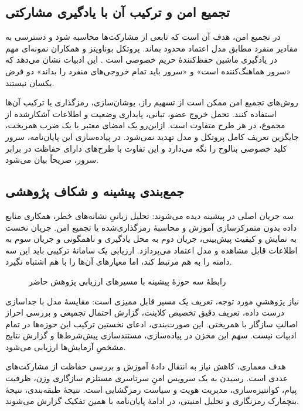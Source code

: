 \subsection{تجمیع امن و ترکیب آن با یادگیری مشارکتی}
در تجمیع امن، هدف آن است که تابعی از مشارکت‌ها محاسبه شود و دسترسی به مقادیر منفرد مطابق مدل اعتماد محدود بماند. پروتکل بوناویتز و همکاران نمونه‌ای مهم در یادگیری ماشین حفظ‌کنندۀ حریم خصوصی است \cite{bonawitz}. این ادبیات نشان می‌دهد که «سرور هماهنگ‌کننده است» و «سرور باید تمام خروجی‌های منفرد را بداند» دو فرض یکسان نیستند.

روش‌های تجمیع امن ممکن است از تسهیم راز، پوشان‌سازی، رمزگذاری یا ترکیب آن‌ها استفاده کنند. تحمل خروج عضو، تبانی، پایداری وضعیت و اطلاعات آشکارشده از مجموع، در هر طرح متفاوت است. ازاین‌رو یک امضای معتبر یا یک ضرب همریخت، جایگزین تعریف کامل پروتکل و مدل تهدید نمی‌شود. در پیاده‌سازی این پایان‌نامه، سرور کلید خصوصی بنالوح را نگه می‌دارد و این تفاوت با طرح‌های دارای حفاظت در برابر سرور، صریحاً بیان می‌شود.

\subsection{جمع‌بندی پیشینه و شکاف پژوهشی}
سه جریان اصلی در پیشینه دیده می‌شوند: تحلیل زبانیِ نشانه‌های خطر، همکاری منابع داده بدون متمرکزسازی آموزش و محاسبۀ رمزگذاری‌شده یا تجمیع امن. جریان نخست به نمایش و کیفیت پیش‌بینی، جریان دوم به محل یادگیری و ناهمگونی و جریان سوم به اطلاعات قابل مشاهده و مدل اعتماد می‌پردازد. ارزیابی یک سامانۀ ترکیبی باید این سه دامنه را به هم مرتبط کند، اما معیارهای آن‌ها را با هم اشتباه نگیرد.

\begin{figure}[htbp]
\centering
\caption{رابطۀ سه حوزۀ پیشینه با مسیرهای ارزیابی پژوهش حاضر}
\label{fig:literature-overview}
\end{figure}

نیاز پژوهشیِ مورد توجه، تعریف یک مسیر قابل ممیزی است: مقایسۀ مدل با جداسازی درست داده، تعریف دقیق تخصیص کلاینت، گزارش احتمال تجمیعی و بررسی احراز اصالتِ سازگار با همریختی. این صورت‌بندی، ادعای نخستین ترکیب این حوزه‌ها در تمام ادبیات نیست. سهم این مخزن در پیاده‌سازی، مستندسازی پیش‌شرط‌ها و گزارش نتایج مشخصِ آزمایش‌ها ارزیابی می‌شود.

هدف معماری، کاهش نیاز به انتقال دادۀ آموزش و بررسی حفاظت از مشارکت‌های عددی است. رسیدن به یک سرویس امنِ سرتاسری مستلزم سازگاری وزن، ظرفیت پیام، کوانتیزه‌سازی، مدیریت هویت و سیاست رمزگشایی است. نتیجۀ طبقه‌بندی، نتیجۀ بنچمارک رمزنگاری و تحلیل امنیتی، در ادامۀ پایان‌نامه با همین تفکیک گزارش می‌شوند.
